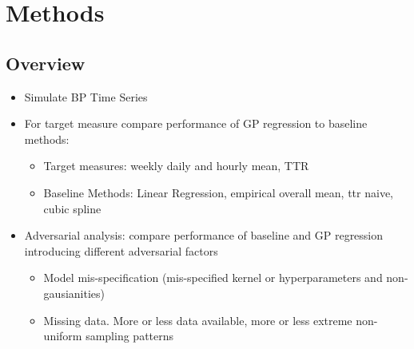 \chapter{Methods}\label{ch:methods}




\section{Overview}



	\begin{itemize}
		\item Simulate BP Time Series
	\end{itemize}

	\bigskip %

	\begin{itemize}
		\item For target measure compare performance of GP regression to baseline methods:
		\begin{itemize}
			\item Target measures: weekly daily and hourly mean, TTR
			\item Baseline Methods: Linear Regression, empirical overall mean, ttr naive, cubic spline
		\end{itemize}
	\end{itemize}

	\bigskip %

	\begin{itemize}
		\item Adversarial analysis: compare performance of baseline and GP regression introducing different adversarial
		factors
		\begin{itemize}
			\item Model mis-specification (mis-specified kernel or hyperparameters and non-gausianities)
			\item Missing data. More or less data available, more or less extreme non-uniform sampling patterns
		\end{itemize}

	\end{itemize}



